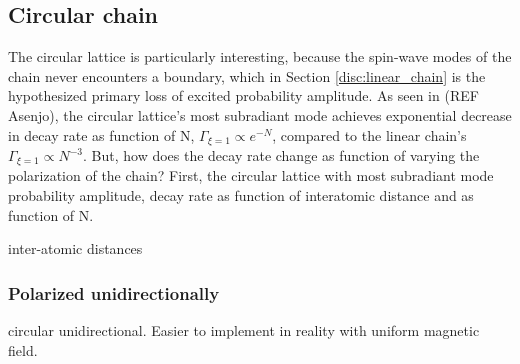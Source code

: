 \documentclass{article}
\begin{document}
\subsection{Circular chain}\label{disc:circular}

The circular lattice is particularly interesting, because the spin-wave modes of the chain never encounters a boundary, which in Section \ref{disc:linear_chain} is the hypothesized primary loss of excited probability amplitude. As seen in (REF Asenjo), the circular lattice's most subradiant mode achieves exponential decrease in decay rate as function of N, $\Gamma_{\xi = 1} \propto e^{-N}$, compared to the linear chain's $\Gamma_{\xi=1} \propto N^{-3}$. But, how does the decay rate change as function of varying the polarization of the chain? First, the circular lattice with most subradiant mode probability amplitude, decay rate as function of interatomic distance and as function of N. 

inter-atomic distances

\subsubsection{Polarized unidirectionally}

circular unidirectional. Easier to implement in reality with uniform magnetic field.
\end{document}

